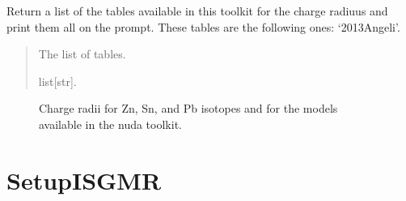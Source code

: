 \documentclass[letterpaper,10pt,english]{sphinxmanual}
\begin{document}
\begin{fulllineitems}
\label{\detokenize{source/api/setup_rad_ch:nucleardatapy.setup_rad_ch.tables_rad_ch}}
\pysigstartsignatures
\pysiglinewithargsret
{}
{}
{}
\pysigstopsignatures
\sphinxAtStartPar
Return a list of the tables available in this toolkit for the charge radiuus and
print them all on the prompt.  These tables are the following
ones: ‘2013\sphinxhyphen{}Angeli’.
\begin{quote}\begin{description}
\sphinxAtStartPar
The list of tables.

\sphinxAtStartPar
list{[}str{]}.

\end{description}\end{quote}

\end{fulllineitems}


\begin{figure}[htbp]
\centering
\capstart

\noindent{}
\caption{Charge radii for Zn, Sn, and Pb isotopes and for the models available in the nuda toolkit.}\label{\detokenize{source/api/setup_rad_ch:id1}}\end{figure}

\sphinxstepscope


\section{SetupISGMR}
\label{\detokenize{source/api/setup_ISGMR:setupisgmr}}\label{\detokenize{source/api/setup_ISGMR::doc}}\label{\detokenize{source/api/setup_ISGMR:module-nucleardatapy.setup_ISGMR}}
\end{document}
